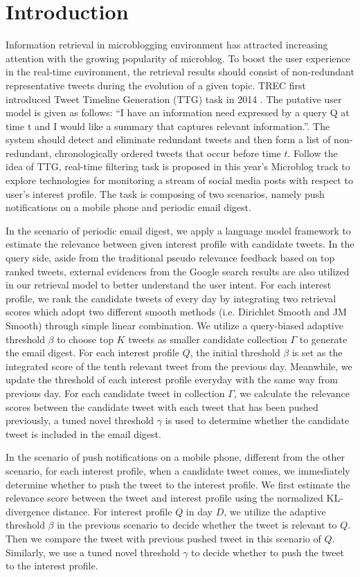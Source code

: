 \section{Introduction}
Information retrieval in microblogging environment has attracted increasing attention with the growing popularity of microblog. To boost the user experience in the real-time environment, the retrieval results should consist of non-redundant representative tweets during the evolution of a given topic. TREC first introduced Tweet Timeline Generation (TTG) task in 2014 \cite{TREC2014}. The putative user model is given as follows: ``I have an information need expressed by a query Q at time t and I would like a summary that captures relevant information.''. The system should detect and eliminate redundant tweets and then form a list of non-redundant, chronologically ordered tweets that occur before time $t$. Follow the idea of TTG, real-time filtering task is proposed in this year's Microblog track to explore technologies for monitoring a stream of social media posts with respect to user's interest profile. The task is composing of two scenarios, namely push notifications on a mobile phone and periodic email digest.

In the scenario of periodic email digest, we apply a language model framework to estimate the relevance between given interest profile with candidate tweets. 
In the query side, aside from the traditional pseudo relevance feedback based on top ranked tweets, external evidences from the Google search results are also utilized in our retrieval model to better understand the user intent. For each interest profile, we rank the candidate tweets of every day by integrating two retrieval scores which adopt two different smooth methods (i.e. Dirichlet Smooth and JM Smooth) through simple linear combination. We utilize a query-biased adaptive threshold $\beta$ to choose top $K$ tweets as smaller candidate collection $\Gamma$ to generate the email digest. For each interest profile $Q$, the initial threshold $\beta$ is set as the integrated score of the tenth relevant tweet from the previous day. Meanwhile, we update the threshold of each interest profile everyday with the same way from previous day. For each candidate tweet in collection $\Gamma$, we calculate the relevance scores between the candidate tweet with each tweet that has been pushed previously, a tuned novel threshold $\gamma$ is used to determine whether the candidate tweet is included in the email digest.

In the scenario of push notifications on a mobile phone, different from the other scenario, for each interest profile, when a candidate tweet comes, we immediately determine whether to push the tweet to the interest profile. We first estimate the relevance score between the tweet and interest profile using the normalized KL-divergence distance. For interest profile $Q$ in day $D$, we utilize the adaptive threshold $\beta$ in the previous scenario to decide whether the tweet is relevant to $Q$. Then we compare the tweet with previous pushed tweet in this scenario of $Q$. Similarly, we use a tuned novel threshold $\gamma$ to decide whether to push the tweet to the interest profile.

